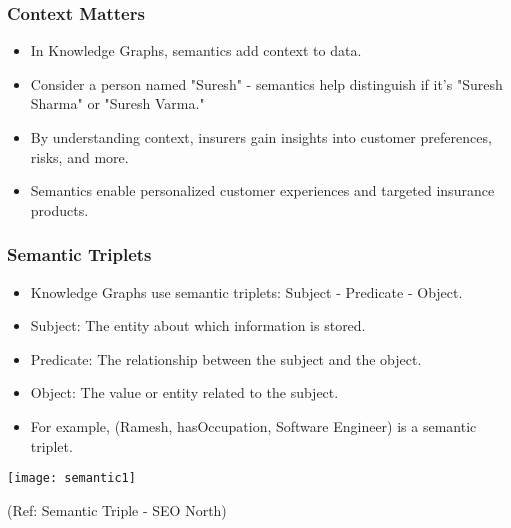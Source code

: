 \begin{frame}[fragile]\frametitle{Context Matters}
  \begin{itemize}
    \item In Knowledge Graphs, semantics add context to data.
    \item Consider a person named "Suresh" - semantics help distinguish if it's "Suresh Sharma" or "Suresh Varma."
    \item By understanding context, insurers gain insights into customer preferences, risks, and more.
    \item Semantics enable personalized customer experiences and targeted insurance products.
  \end{itemize}
\end{frame}

\begin{frame}[fragile]\frametitle{Semantic Triplets}
  \begin{itemize}
    \item Knowledge Graphs use semantic triplets: Subject - Predicate - Object.
    \item Subject: The entity about which information is stored.
    \item Predicate: The relationship between the subject and the object.
    \item Object: The value or entity related to the subject.
    \item For example, (Ramesh, hasOccupation, Software Engineer) is a semantic triplet.
  \end{itemize}
  
\begin{center}
\texttt{[image: semantic1]}

{\tiny (Ref: Semantic Triple - SEO North)}

\end{center}  
\end{frame}

